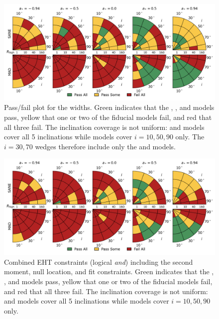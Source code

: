 \label{sec:mring}

\begin{figure}
 \centering
 \includegraphics[width=\textwidth]{./figures/Mring_w_Constraints.png}
  \caption{Pass/fail plot for the \mring widths.
    Green indicates that the \kharma, \bhac, and \hamr models pass, yellow that one or two of the fiducial models fail, and red that all three fail.
    The inclination coverage is not uniform: \bhac and \kharma models cover all 5 inclinations while \hamr models cover $i = 10, 50, 90$ only.
    The $i = 30, 70$ wedges therefore include only the \bhac and \kharma models.}
  \label{fig:mring_width_salsa} %
\end{figure}

\begin{figure}
  \centering
  \includegraphics[width=\textwidth]{./figures/Interferometric_Constraints.png}
  \caption{Combined EHT constraints (logical {\em and}) including the second moment, null location, and \mring fit constraints.
    Green indicates that the \kharma, \bhac, and \hamr models pass, yellow that one or two of the fiducial models fail, and red that all three fail.
    The inclination coverage is not uniform: \bhac and \kharma models cover all 5 inclinations while \hamr models cover $i = 10, 50, 90$ only.}
  \label{fig:all_EHT_constraints} %
\end{figure}

